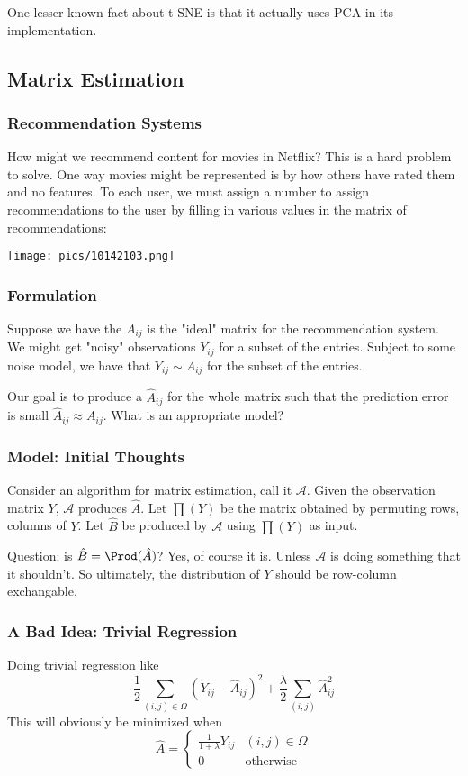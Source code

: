 \documentclass[11pt]{scrartcl}
\begin{document}
One lesser known fact about t-SNE is that it actually uses PCA in its implementation. 

\subsection{Matrix Estimation}

\subsubsection{Recommendation Systems}
How might we recommend content for movies in Netflix? This is a hard problem to solve. One way movies might be represented is by how others have rated them and no features. To each user, we must assign a number to assign recommendations to the user by filling in various values in the matrix of recommendations: 
\begin{center}
    \texttt{[image: pics/10142103.png]}
\end{center}

\subsubsection{Formulation}
Suppose we have the  $A_{ij}$ is the "ideal" matrix for the recommendation system. We might get "noisy" observations $Y_{ij}$ for a subset of the entries. Subject to some noise model, we have that $Y_{ij} \sim A_{ij}$ for the subset of the entries. 

Our goal is to produce a $\hat{A}_{ij}$ for the whole matrix such that the prediction error is small $\hat{A}_{ij} \approx A_{ij}$. What is an appropriate model? 

\subsubsection{Model: Initial Thoughts}
Consider an algorithm for matrix estimation, call it $\mathcal{A}$. Given the observation matrix $Y$, $\mathcal{A}$ produces $\hat{A}$. Let $\prod(Y)$ be the matrix obtained by permuting rows, columns of $Y$. Let $\hat{B}$ be produced by $\mathcal{A}$ using $\prod(Y)$ as input. 

Question: is $\hat{B}=\Prod(\hat{A})$? Yes, of course it is. Unless $\mathcal{A}$ is doing something that it shouldn't. So ultimately, the distribution of $Y$ should be row-column exchangable. 

\subsubsection{A Bad Idea: Trivial Regression}
Doing trivial regression like $$\frac{1}{2}\sum_{(i,j) \in \Omega}(Y_{ij}-\hat{A}_{ij})^2+\frac{\lambda}{2}\sum_{(i,j)} \hat{A}_{ij}^2$$
This will obviously be minimized when $$\hat{A}=\begin{cases} \frac{1}{1+\lambda}Y_{ij} & (i,j) \in \Omega \\ 0 & \text{otherwise}\end{cases}$$
\end{document}
